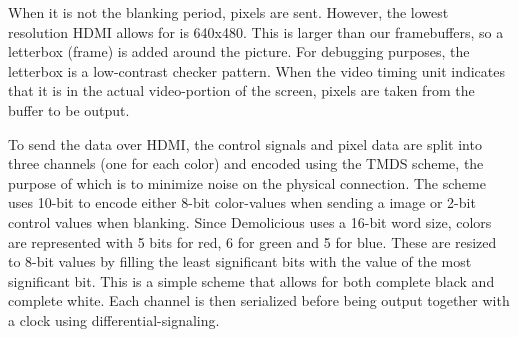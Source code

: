 \documentclass[../main/report.tex]{subfiles}
\begin{document}
When it is not the blanking period, pixels are sent.
However, the lowest resolution HDMI allows for is 640x480.
This is larger than our framebuffers, so a letterbox (frame) is added around the picture.
For debugging purposes, the letterbox is a low-contrast checker pattern.
When the video timing unit indicates that it is in the actual video-portion of the screen, pixels are taken from the buffer to be output.

To send the data over HDMI, the control signals and pixel data are split into three channels (one for each color) and encoded using the TMDS scheme, the purpose of which is to minimize noise on the physical connection.
The scheme uses 10-bit to encode either 8-bit color-values when sending a image or 2-bit control values when blanking.
Since Demolicious uses a 16-bit word size, colors are represented with 5 bits for red, 6 for green and 5 for blue.
These are resized to 8-bit values by filling the least significant bits with the value of the most significant bit.
This is a simple scheme that allows for both complete black and complete white.
Each channel is then serialized before being output together with a clock using differential-signaling.
\end{document}
